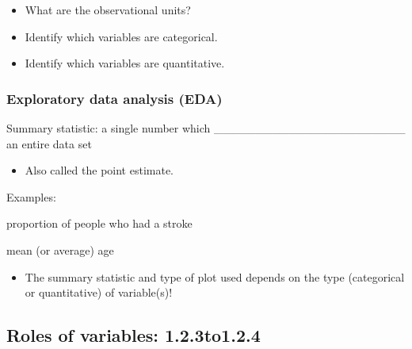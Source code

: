 \documentclass[
]{report}
\providecommand{\tightlist}{%
  \setlength{\itemsep}{0pt}\setlength{\parskip}{0pt}}
\newcommand{\rgi}{\hspace{24pt}}  %
\begin{document}
\begin{itemize}
\tightlist
\item
  What are the observational units?
\end{itemize}

\vspace{0.2in}

\begin{itemize}
\tightlist
\item
  Identify which variables are categorical.
\end{itemize}

\vspace{0.2in}

\begin{itemize}
\tightlist
\item
  Identify which variables are quantitative.
\end{itemize}

\vspace{0.2in}

\subsubsection*{Exploratory data analysis (EDA)}\label{exploratory-data-analysis-eda}

Summary statistic: a single number which \_\_\_\_\_\_\_\_\_\_\_\_\_\_\_\_\_\_\_\_\_\_\_ an entire data set

\begin{itemize}
\tightlist
\item
  Also called the point estimate.
\end{itemize}

\rgi Examples:

\rgi \rgi proportion of people who had a stroke

\vspace{0.3in}

\rgi \rgi mean (or average) age

\vspace{0.3in}

\begin{itemize}
\tightlist
\item
  The summary statistic and type of plot used depends on the type (categorical or quantitative) of variable(s)!
\end{itemize}

\newpage

\subsection*{Roles of variables: 1.2.3to1.2.4}\label{roles-of-variables-1.2.3to1.2.4}
\end{document}
